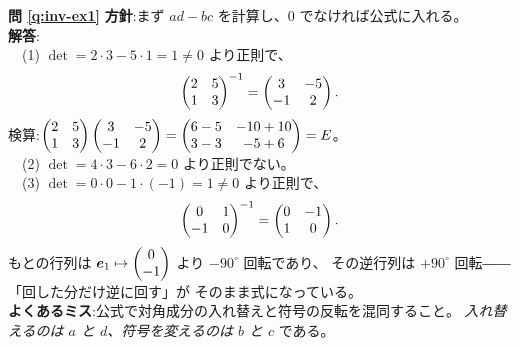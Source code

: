 \bigskip
\noindent\textbf{問 \ref{q:inv-ex1}}\quad
\textbf{方針}:まず $ad - bc$ を計算し、$0$ でなければ公式に入れる。\\
\textbf{解答}:\\
　(1) $\det = 2 \cdot 3 - 5 \cdot 1 = 1 \neq 0$ より正則で、
\[
\begin{pmatrix}2 & 5 \\ 1 & 3\end{pmatrix}^{-1} = \begin{pmatrix}3 & -5 \\ -1 & 2\end{pmatrix}.
\]
検算:$\begin{pmatrix}2 & 5 \\ 1 & 3\end{pmatrix}\begin{pmatrix}3 & -5 \\ -1 & 2\end{pmatrix}
= \begin{pmatrix}6 - 5 & -10 + 10 \\ 3 - 3 & -5 + 6\end{pmatrix} = E$。\\
　(2) $\det = 4 \cdot 3 - 6 \cdot 2 = 0$ より正則でない。\\
　(3) $\det = 0 \cdot 0 - 1 \cdot (-1) = 1 \neq 0$ より正則で、
\[
\begin{pmatrix}0 & 1 \\ -1 & 0\end{pmatrix}^{-1} = \begin{pmatrix}0 & -1 \\ 1 & 0\end{pmatrix}.
\]
もとの行列は $\bm{e}_1 \mapsto \begin{pmatrix}0 \\ -1\end{pmatrix}$ より $-90^\circ$ 回転であり、
その逆行列は $+90^\circ$ 回転――「回した分だけ逆に回す」が
そのまま式になっている。\\
\textbf{よくあるミス}:公式で対角成分の入れ替えと符号の反転を混同すること。
\emph{入れ替えるのは $a$ と $d$、符号を変えるのは $b$ と $c$} である。


